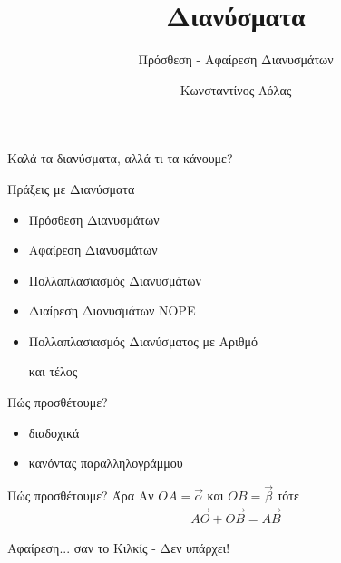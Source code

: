 \documentclass{presentation}
\title{Διανύσματα}
\subtitle{Πρόσθεση - Αφαίρεση Διανυσμάτων}
\author[Λόλας]{Κωνσταντίνος Λόλας}
\date{}
\begin{document}
\begin{frame}
  \titlepage
\end{frame}

\begin{frame}{Καλά τα διανύσματα, αλλά τι τα κάνουμε?}

\end{frame}

\begin{frame}{Πράξεις με Διανύσματα}
  \begin{itemize}
    \item Πρόσθεση Διανυσμάτων
    \item Αφαίρεση Διανυσμάτων
    \item Πολλαπλασιασμός Διανυσμάτων
    \item Διαίρεση Διανυσμάτων NOPE
    \item Πολλαπλασιασμός Διανύσματος με Αριθμό


          και τέλος
  \end{itemize}
\end{frame}

\begin{frame}{Πώς προσθέτουμε?}
  \begin{itemize}
    \item διαδοχικά
    \item κανόντας παραλληλογράμμου
  \end{itemize}
\end{frame}

\begin{frame}{Πώς προσθέτουμε? Άρα}
  Αν $ΟΑ=\vec{α}$ και $ΟΒ=\vec{β}$ τότε
  \begin{align*}
    \overrightarrow{ΑΟ}+\overrightarrow{ΟΒ}=\overrightarrow{ΑΒ}
  \end{align*}
\end{frame}

\begin{frame}{Αφαίρεση... σαν το Κιλκίς - Δεν υπάρχει!}

\end{frame}
\end{document}
